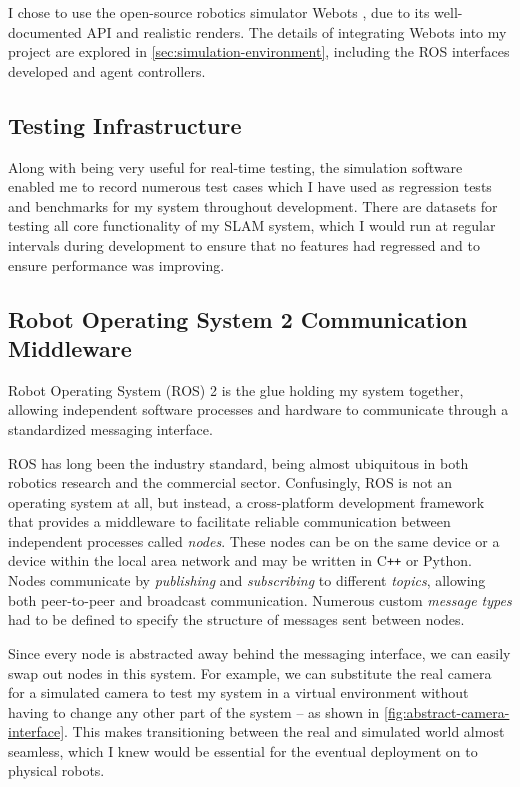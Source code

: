 I chose to use the open-source robotics simulator Webots \autocite{Webots04}, due to its well-documented API and realistic renders. The details of integrating Webots into my project are explored in \autoref{sec:simulation-environment}, including the ROS interfaces developed and agent controllers.

\subsection{Testing Infrastructure}
\label{sec:testing-infrastructure}

Along with being very useful for real-time testing, the simulation software enabled me to record numerous test cases which I have used as regression tests and benchmarks for my system throughout development. There are datasets for testing all core functionality of my SLAM system, which I would run at regular intervals during development to ensure that no features had regressed and to ensure performance was improving.

\subsection{Robot Operating System 2 Communication Middleware}
\label{sec:ros-2}
Robot Operating System (ROS) 2 is the glue holding my system together, allowing independent software processes and hardware to communicate through a standardized messaging interface.

ROS has long been the industry standard, being almost ubiquitous in both robotics research and the commercial sector. Confusingly, ROS is not an operating system at all, but instead, a cross-platform development framework that provides a middleware to facilitate reliable communication between independent processes called \textit{nodes}. These nodes can be on the same device or a device within the local area network and may be written in C\texttt{++} or Python. Nodes communicate by \textit{publishing} and \textit{subscribing} to different \textit{topics}, allowing both peer-to-peer and broadcast communication. Numerous custom \textit{message types} had to be defined to specify the structure of messages sent between nodes.

Since every node is abstracted away behind the messaging interface, we can easily swap out nodes in this system. For example, we can substitute the real camera for a simulated camera to test my system in a virtual environment without having to change any other part of the system – as shown in \autoref{fig:abstract-camera-interface}. This makes transitioning between the real and simulated world almost seamless, which I knew would be essential for the eventual deployment on to physical robots.

